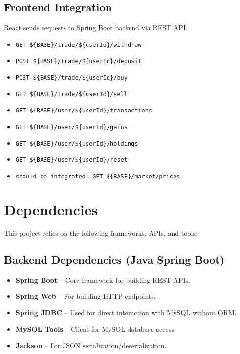 \documentclass[a4paper,12pt]{article}
\begin{document}
\subsection{Frontend Integration}
React sends requests to Spring Boot backend via REST API.
\begin{itemize}
    
    \item \texttt{GET \$\{BASE\}/trade/\$\{userId\}/withdraw}
    \item \texttt{POST \$\{BASE\}/trade/\$\{userId\}/deposit}
    \item \texttt{POST \$\{BASE\}/trade/\$\{userId\}/buy}
    \item \texttt{GET \$\{BASE\}/trade/\$\{userId\}/sell}
    \item \texttt{GET \$\{BASE\}/user/\$\{userId\}/transactions}
    \item \texttt{GET \$\{BASE\}/user/\$\{userId\}/gains}
    \item \texttt{GET \$\{BASE\}/user/\$\{userId\}/holdings}
    \item \texttt{GET \$\{BASE\}/user/\$\{userId\}/reset}
    \item \texttt{should be integrated: {GET \$\{BASE\}/market/prices}}
\end{itemize}

\section{Dependencies}

This project relies on the following frameworks, APIs, and tools:

\subsection{Backend Dependencies (Java Spring Boot)}
\begin{itemize}[label=-, itemsep=0.2em]
    \item \textbf{Spring Boot} – Core framework for building REST APIs.
    \item \textbf{Spring Web} – For building HTTP endpoints.
    \item \textbf{Spring JDBC} – Used for direct interaction with MySQL without ORM.
    \item \textbf{MySQL Tools} – Client for MySQL database access.
    \item \textbf{Jackson} – For JSON serialization/deserialization.
\end{itemize}
\end{document}
